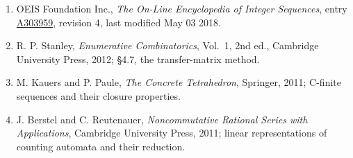 \documentclass[11pt]{article}
\theoremstyle{definition}
\begin{document}
\begin{enumerate}

\item OEIS Foundation Inc., \emph{The On-Line Encyclopedia of Integer Sequences}, entry \href{https://oeis.org/A303959}{A303959}, revision 4, last modified May 03 2018.

\item R. P. Stanley, \emph{Enumerative Combinatorics}, Vol.~1, 2nd ed., Cambridge University Press, 2012; \S4.7, the transfer-matrix method.

\item M. Kauers and P. Paule, \emph{The Concrete Tetrahedron}, Springer, 2011; C-finite sequences and their closure properties.

\item J. Berstel and C. Reutenauer, \emph{Noncommutative Rational Series with Applications}, Cambridge University Press, 2011; linear representations of counting automata and their reduction.

\end{enumerate}
\end{document}
